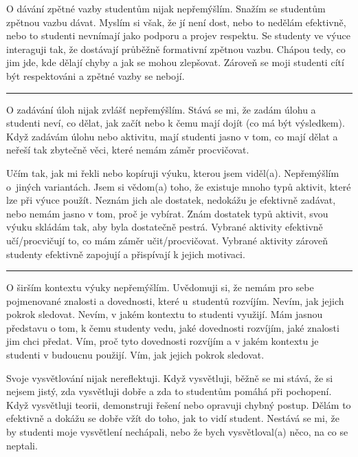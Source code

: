 \newpage
{}
{O dávání zpětné vazby studentům nijak nepřemýšlím.}
{Snažím se studentům zpětnou vazbu dávat. Myslím si však, že jí není dost, nebo to nedělám efektivně, nebo to studenti nevnímají jako podporu a projev respektu.}
{Se studenty ve výuce interaguji tak, že dostávají průběžně formativní zpětnou vazbu. Chápou tedy, co jim jde, kde dělají chyby a jak se mohou zlepšovat. Zároveň se moji studenti cítí být respektováni a zpětné vazby se nebojí.}

\rule{\textwidth}{0.4pt}
{O zadávání úloh nijak zvlášť nepřemýšlím.}
{Stává se mi, že zadám úlohu a studenti neví, co dělat, jak začít nebo k čemu mají dojít (co má být výsledkem).}
{Když zadávám úlohu nebo aktivitu, mají studenti jasno v tom, co mají dělat a neřeší tak zbytečně věci, které nemám záměr procvičovat.}

\newpage
{}
{Učím tak, jak mi řekli nebo kopíruji výuku, kterou jsem viděl(a). Nepřemýšlím o~jiných variantách.}
{Jsem si vědom(a) toho, že existuje mnoho typů aktivit, které lze při výuce použít. Neznám jich ale dostatek, nedokážu je efektivně zadávat, nebo nemám jasno v tom, proč je vybírat.}
{Znám dostatek typů aktivit, svou výuku skládám tak, aby byla dostatečně pestrá. Vybrané aktivity efektivně učí/procvičují to, co mám záměr učit/procvičovat. Vybrané aktivity zároveň studenty efektivně zapojují a přispívají k jejich motivaci.}

\rule{\textwidth}{0.4pt}
{O širším kontextu výuky nepřemýšlím.}
{Uvědomuji si, že nemám pro sebe pojmenované znalosti a dovednosti, které u~studentů rozvíjím. Nevím, jak jejich pokrok sledovat. Nevím, v jakém kontextu to studenti využijí.}
{Mám jasnou představu o tom, k čemu studenty vedu, jaké dovednosti rozvíjím, jaké znalosti jim chci předat. Vím, proč tyto dovednosti rozvíjím a v jakém kontextu je studenti v budoucnu použijí. Vím, jak jejich pokrok sledovat.}
\vspace*{-1em}

\newpage
{}
{Svoje vysvětlování nijak nereflektuji.}
{Když vysvětluji, běžně se mi stává, že si nejsem jistý, zda vysvětluji dobře a zda to studentům pomáhá při pochopení.}
{Když vysvětluji teorii, demonstruji řešení nebo opravuji chybný postup. Dělám to efektivně a dokážu se dobře vžít do toho, jak to vidí student. Nestává se mi, že by studenti moje vysvětlení nechápali, nebo že bych vysvětloval(a) něco, na co se neptali.}

